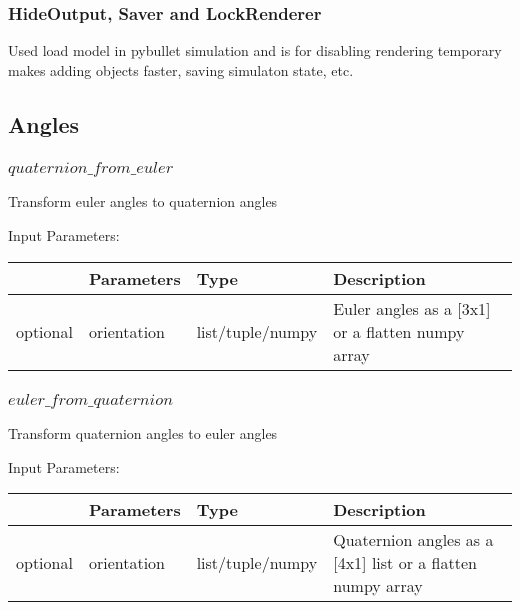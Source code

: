 \documentclass[
	ngerman,
	accentcolor=9c,%
	type=intern,
	marginpar=false
	]{tudapub}
\begin{document}
\subsubsection{HideOutput, Saver and LockRenderer}
\noindent Used load model in pybullet simulation and is for disabling rendering temporary makes adding objects faster, saving simulaton state, etc.


\vspace{0.5cm}






\subsection{Angles}
\subsubsection{$quaternion\_from\_euler$}
\noindent Transform euler angles to quaternion angles


\vspace{0.5cm}
\noindent Input Parameters:
\vspace{0.5cm}

\begin{tabular}{|p{}|p{}|p{}| p{}|}
\hline
 & \textbf{Parameters} & \textbf{Type} & \textbf{Description} \\
\hline
optional & orientation & list/tuple/numpy &  Euler angles as a [3x1] or a flatten numpy array \\
\hline
\end{tabular}
\vspace{0.5cm}


\subsubsection{$euler\_from\_quaternion$}
\noindent Transform quaternion angles to euler angles


\vspace{0.5cm}
\noindent Input Parameters:
\vspace{0.5cm}

\begin{tabular}{|p{}|p{}|p{}| p{}|}
\hline
 & \textbf{Parameters} & \textbf{Type} & \textbf{Description} \\
\hline
optional & orientation & list/tuple/numpy & Quaternion angles as a [4x1] list or a flatten numpy array\\
\hline
\end{tabular}
\vspace{0.5cm}
\end{document}
